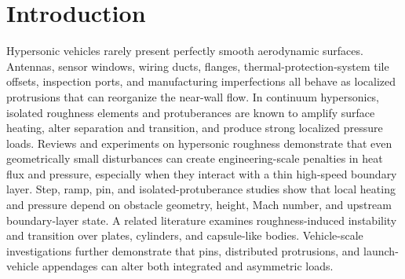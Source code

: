 \documentclass[aip,pof,preprint,floatfix,amsmath,amssymb]{revtex4-2}
\begin{document}

\maketitle

\section{Introduction}
Hypersonic vehicles rarely present perfectly smooth aerodynamic surfaces. Antennas, sensor windows, wiring ducts, flanges, thermal-protection-system tile offsets, inspection ports, and manufacturing imperfections all behave as localized protrusions that can reorganize the near-wall flow. In continuum hypersonics, isolated roughness elements and protuberances are known to amplify surface heating, alter separation and transition, and produce strong localized pressure loads. Reviews and experiments on hypersonic roughness demonstrate that even geometrically small disturbances can create engineering-scale penalties in heat flux and pressure, especially when they interact with a thin high-speed boundary layer.\cite{Schneider2008,BerryHorvath2008} Step, ramp, pin, and isolated-protuberance studies show that local heating and pressure depend on obstacle geometry, height, Mach number, and upstream boundary-layer state.\cite{Grotowsky2000,Estruch2010,Chang2010,Qamar2012,Hahn2013,KumarReddy2013,KumarReddy2014} A related literature examines roughness-induced instability and transition over plates, cylinders, and capsule-like bodies.\cite{DeTullio2013,Avallone2016,DuanXiao2017,DiGiovanni2018,BlancoCasares2022,Haley2023} Vehicle-scale investigations further demonstrate that pins, distributed protrusions, and launch-vehicle appendages can alter both integrated and asymmetric loads.\cite{Akshay2021,Tsutsui2022,Chandrakumar2023,Leopardi2024}
\end{document}
